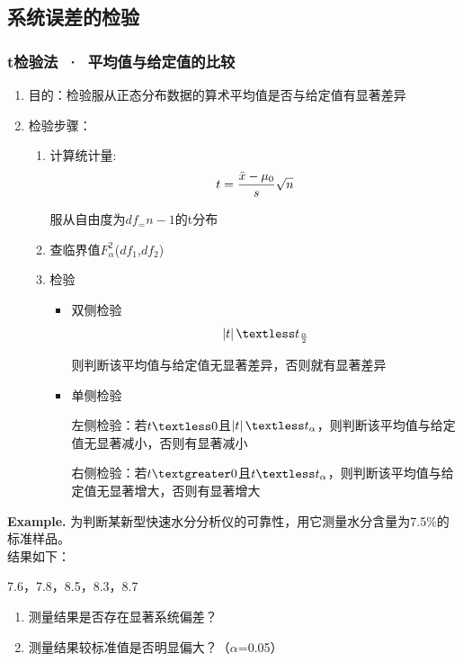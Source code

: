 \documentclass[UTF8]{ctexart}
\begin{document}
\subsection{系统误差的检验}
\subsubsection{t检验法\ ·\ 平均值与给定值的比较}
\begin{enumerate}[•]
  \item 目的：检验服从正态分布数据的算术平均值是否与给定值有显著差异
  \item 检验步骤：
  \begin{enumerate}[1.]
    \item 计算统计量:
\begin{equation}\notag
t=\frac{\bar{x}-\mu_0}{s} \sqrt{n} 
\end{equation}
\par 服从自由度为$df_=n-1$的t分布
    \item 查临界值$F^{2}_{\alpha}$($df_{1}$,$df_{2}$)
    \item 检验
    \begin{itemize}
    \item 双侧检验
      \begin{equation}\notag
      \left\lvert t\right\rvert \textless t_{\frac{\alpha }{2} }
      \end{equation}
      \par \quad 则判断该平均值与给定值无显著差异，否则就有显著差异
    \item 单侧检验
      \par\quad 左侧检验：若$t\textless 0$且$\left\lvert t\right\rvert \textless t_{\alpha}$，则判断该平均值与给定值无显著减小，否则有显著减小
      \par\quad 右侧检验：若$t\textgreater 0$且$ t \textless t_{\alpha}$，则判断该平均值与给定值无显著增大，否则有显著增大
    \end{itemize} 
  \end{enumerate}
\end{enumerate}

\textbf{Example.}
为判断某新型快速水分分析仪的可靠性，用它测量水分含量为7.5$\%$的标准样品。
\\结果如下：
\par 7.6，7.8，8.5，8.3，8.7
\begin{enumerate}[（1）]
\item 测量结果是否存在显著系统偏差？
\item 测量结果较标准值是否明显偏大？（$\alpha$=0.05）
\end{enumerate}
\end{document}
